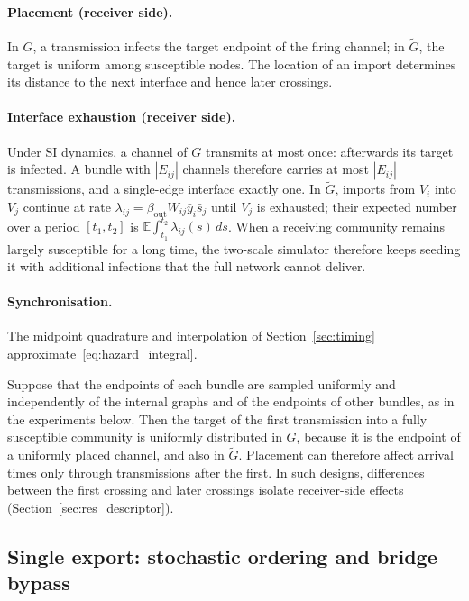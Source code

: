 \documentclass[a4paper,fleqn]{cas-sc}
\newcommand{\ibar}{\bar{y}}
\newcommand{\sbar}{\bar{s}}
\begin{document}
\paragraph{Placement (receiver side).}
In $G$, a transmission infects the target endpoint of the firing channel; in $\tilde G$, the target is uniform among susceptible nodes. The location of an import determines its distance to the next interface and hence later crossings.

\paragraph{Interface exhaustion (receiver side).}
Under SI dynamics, a channel of $G$ transmits at most once: afterwards its target is infected. A bundle with $|E_{ij}|$ channels therefore carries at most $|E_{ij}|$ transmissions, and a single-edge interface exactly one. In $\tilde G$, imports from $V_i$ into $V_j$ continue at rate $\lambda_{ij}=\beta_{\mathrm{out}}W_{ij}\ibar_i\sbar_j$ until $V_j$ is exhausted; their expected number over a period $[t_1,t_2]$ is $\mathbb{E}\int_{t_1}^{t_2}\lambda_{ij}(s)\,ds$. When a receiving community remains largely susceptible for a long time, the two-scale simulator therefore keeps seeding it with additional infections that the full network cannot deliver.

\paragraph{Synchronisation.}
The midpoint quadrature and interpolation of Section~\ref{sec:timing} approximate~\eqref{eq:hazard_integral}.

\begin{remark}
\label{rem:placement}
Suppose that the endpoints of each bundle are sampled uniformly and independently of the internal graphs and of the endpoints of other bundles, as in the experiments below. Then the target of the first transmission into a fully susceptible community is uniformly distributed in $G$, because it is the endpoint of a uniformly placed channel, and also in $\tilde G$. Placement can therefore affect arrival times only through transmissions after the first. In such designs, differences between the first crossing and later crossings isolate receiver-side effects (Section~\ref{sec:res_descriptor}).
\end{remark}

\subsection{Single export: stochastic ordering and bridge bypass}
\label{sec:single_export}
\end{document}
